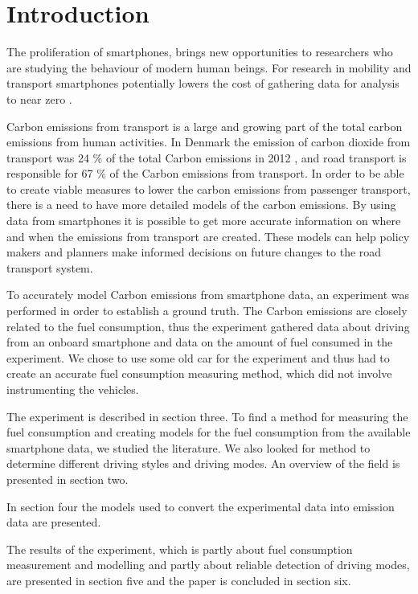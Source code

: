 \section{Introduction}

The proliferation of smartphones, brings new opportunities to researchers who are studying the behaviour of modern human beings. For research in mobility and transport smartphones potentially lowers the cost of gathering data for analysis to near zero \cite{Liu2013}.

Carbon emissions from transport is a large and growing part of the total carbon emissions from human activities. In Denmark the emission of carbon dioxide from transport was 24 \% of the total Carbon emissions in 2012 \cite{nielsen2014}, and road transport is responsible for 67 \% of the Carbon emissions from transport. In order to be able to create viable measures to lower the carbon emissions from passenger transport, there is a need to have more detailed models of the carbon emissions. By using data from smartphones it is possible to get more accurate information on where and when the emissions from transport are created. These models can help policy makers and planners make informed decisions on future changes to the road transport system.

To accurately model Carbon emissions from smartphone data, an experiment was performed in order to establish a ground truth. The Carbon emissions are closely related to the fuel consumption, thus the experiment gathered data about driving from an onboard smartphone and data on the amount of fuel consumed in the experiment. We chose to use some old car for the experiment and thus had to create an accurate fuel consumption measuring method, which did not involve instrumenting the vehicles. 

The experiment is described  in section three. To find a method for measuring the fuel consumption and creating models for the fuel consumption from the available smartphone data, we studied the literature. We also looked for method to determine different driving styles and driving modes. An overview of the field is presented in section two.

In section four the models used to convert the experimental data into emission data are presented. 

The results of the experiment, which is partly about fuel consumption measurement and modelling and partly about reliable detection of driving modes, are presented in section five and the paper is concluded in section six.